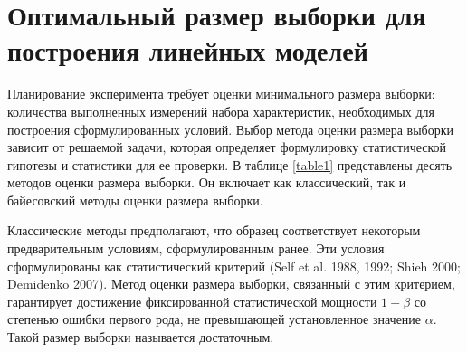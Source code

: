\newpage

\section{Оптимальный размер выборки для построения линейных моделей}
Планирование эксперимента требует оценки минимального размера выборки: количества выполненных измерений набора характеристик, необходимых для построения сформулированных условий. Выбор метода оценки размера выборки зависит от решаемой задачи, которая определяет формулировку статистической гипотезы и статистики для ее проверки. В таблице \ref{table1} представлены десять методов оценки размера выборки. Он включает как классический, так и байесовский методы оценки размера выборки.

Классические методы предполагают, что образец соответствует некоторым предварительным условиям, сформулированным ранее. Эти условия сформулированы как статистический критерий (Self et al. 1988, 1992; Shieh 2000; Demidenko 2007). Метод оценки размера выборки, связанный с этим критерием, гарантирует достижение фиксированной статистической мощности $1-\beta$ со степенью ошибки первого рода, не превышающей установленное значение $\alpha$. Такой размер выборки называется достаточным.


